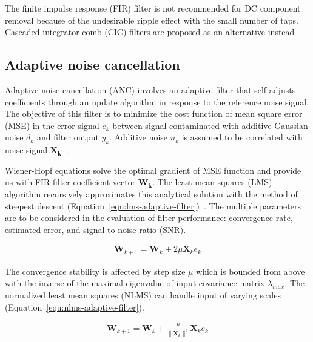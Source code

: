 The finite impulse response (FIR) filter is not recommended for DC component removal because of the undesirable ripple effect with the small number of taps. Cascaded-integrator-comb (CIC) filters are proposed as an alternative instead~\cite{lyons_understanding_2011}.

\subsection{Adaptive noise cancellation}
Adaptive noise cancellation (ANC) involves an adaptive filter that self-adjusts coefficients through an update algorithm in response to the reference noise signal.  The objective of this filter is to minimize the cost function of mean square error (MSE) in the error signal $e_k$ between signal contaminated with additive Gaussian noise $d_k$ and filter output $y_k$. Additive noise $n_k$ is assumed to be correlated with noise signal $\mathbf{X_k}$~\cite{diniz_adaptive_2020}.

Wiener-Hopf equations solve the optimal gradient of MSE function and provide us with FIR filter coefficient vector $\mathbf{W_k}$.  The least mean squares (LMS) algorithm recursively approximates this analytical solution with the method of steepest descent (Equation~\ref{equ:lms-adaptive-filter})~\cite{diniz_adaptive_2020}. The multiple parameters are to be considered in the evaluation of filter performance: convergence rate, estimated error, and signal-to-noise ratio (SNR).

\begin{ceqn}\begin{align} \label{equ:lms-adaptive-filter}
\mathbf{W}_{k+1} = \mathbf{W}_{k} + 2 \mu \mathbf{X}_{k}  e_k
\end{align}\end{ceqn}

The convergence stability is affected by step size $\mu$ which is bounded from above with the inverse of the maximal eigenvalue of input covariance matrix $\lambda_{max}$. The normalized least mean squares (NLMS) can handle input of varying scales  (Equation~\ref{equ:nlms-adaptive-filter}).

\begin{ceqn}\begin{align} \label{equ:nlms-adaptive-filter}
\mathbf{W}_{k+1} = \mathbf{W}_{k} + \frac{\mu}{\lVert\mathbf{X}_{k}\rVert^2} \mathbf{X}_{k}  e_k
\end{align}\end{ceqn}

